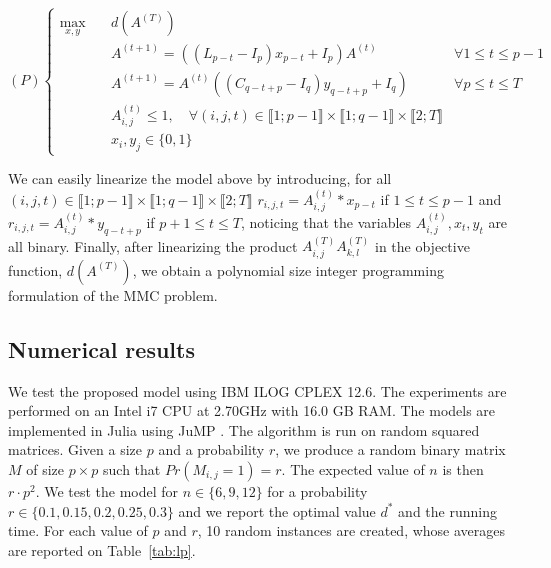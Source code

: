 \begin{equation*}
(P)\left\{
\begin{array}{lll}
\max\limits_{x,y}  \quad	& d(A^{(T)})  \\
& A^{(t+1)}= ((L_{p-t}-I_p)x_{p-t}+I_p)A^{(t)} \qquad & \forall 1\le t\le p-1\\
& A^{(t+1)}= A^{(t)}((C_{q-t+p}-I_q)y_{q-t+p}+I_q) \qquad & \forall p\leq t\le T\\
& A^{(t)}_{i,j} \le 1, \quad \forall (i,j,t) \in \llbracket 1; p-1 \rrbracket \times \llbracket 1; q-1 \rrbracket \times \llbracket 2; T \rrbracket \\
& x_i,y_j \in \{0,1\}
\end{array}\right.
\end{equation*}

\noindent We can easily linearize the model above by introducing, for all $(i,j,t) \in \llbracket 1; p-1 \rrbracket \times \llbracket 1; q-1 \rrbracket \times \llbracket 2; T \rrbracket $ $r_{i,j,t}=A^{(t)}_{i,j}*x_{p-t}$ if $1\le t\le p-1$ and $r_{i,j,t}=A^{(t)}_{i,j}*y_{q-t+p}$ if $p+1\le t\le T$, noticing that the variables $A^{(t)}_{i,j},x_t,y_t$ are all binary. Finally, after linearizing the product $A^{(T)}_{i,j}A^{(T)}_{k,l}$ in the objective function, $d(A^{(T)})$, we obtain a polynomial size integer programming formulation of the MMC problem.



\subsection{Numerical results}

We test the proposed model using IBM ILOG CPLEX 12.6. The experiments are performed on an Intel i7 CPU at 2.70GHz with 16.0 GB RAM. The models are implemented in Julia using JuMP \cite{Lubin2015}. The algorithm is run on random squared matrices. Given a size $p$ and a probability $r$, we produce a random binary matrix $M$ of size $p \times p$ such that $Pr(M_{i,j} = 1) = r$. The expected value of $n$ is then $r \cdot p^2$. We test the model for $n \in \{6,9,12\}$ for a probability $r \in \{0.1,0.15,0.2,0.25,0.3\}$ and we report the optimal value $d^*$ and the running time. For each value of $p$ and $r$, 10 random instances are created, whose averages are reported on Table~\ref{tab:lp}.

\vspace{-0.5cm}

